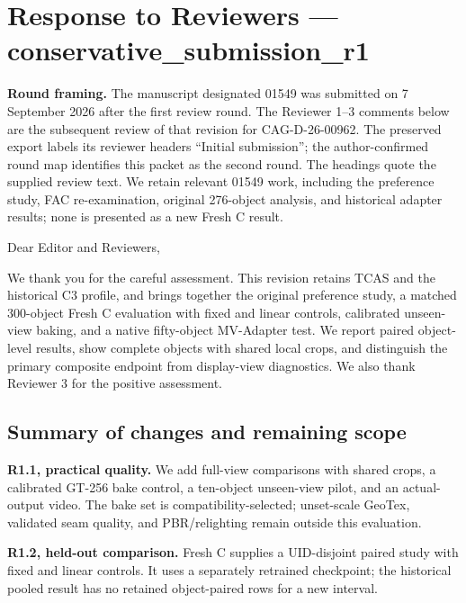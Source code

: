 \documentclass[
  10pt,
]{article}
\author{}
\date{}
\begin{document}
\hypertarget{response-to-reviewers--conservative_submission_r1}{%
\section{Response to Reviewers --- conservative\_submission\_r1}\label{response-to-reviewers--conservative_submission_r1}}

\textbf{Round framing.} The manuscript designated 01549 was submitted on 7 September 2026 after the first review round. The Reviewer 1--3 comments below are the subsequent review of that revision for CAG-D-26-00962. The preserved export labels its reviewer headers ``Initial submission''; the author-confirmed round map identifies this packet as the second round. The headings quote the supplied review text. We retain relevant 01549 work, including the preference study, FAC re-examination, original 276-object analysis, and historical adapter results; none is presented as a new Fresh C result.

Dear Editor and Reviewers,

We thank you for the careful assessment. This revision retains TCAS and the historical C3 profile, and brings together the original preference study, a matched 300-object Fresh C evaluation with fixed and linear controls, calibrated unseen-view baking, and a native fifty-object MV-Adapter test. We report paired object-level results, show complete objects with shared local crops, and distinguish the primary composite endpoint from display-view diagnostics. We also thank Reviewer 3 for the positive assessment.

\hypertarget{summary-of-changes-and-remaining-scope}{%
\subsection{Summary of changes and remaining scope}\label{summary-of-changes-and-remaining-scope}}

\textbf{R1.1, practical quality.} We add full-view comparisons with shared crops, a calibrated GT-256 bake control, a ten-object unseen-view pilot, and an actual-output video. The bake set is compatibility-selected; unset-scale GeoTex, validated seam quality, and PBR/relighting remain outside this evaluation.

\textbf{R1.2, held-out comparison.} Fresh C supplies a UID-disjoint paired study with fixed and linear controls. It uses a separately retrained checkpoint; the historical pooled result has no retained object-paired rows for a new interval.
\end{document}
